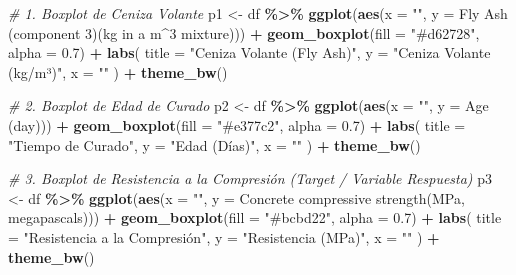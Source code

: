 \documentclass[
]{book}
\newenvironment{Shaded}{\begin{snugshade}}{\end{snugshade}}
\newcommand{\AttributeTok}[1]{\textcolor[rgb]{0.13,0.29,0.53}{#1}}
\newcommand{\CommentTok}[1]{\textcolor[rgb]{0.56,0.35,0.01}{\textit{#1}}}
\newcommand{\FloatTok}[1]{\textcolor[rgb]{0.00,0.00,0.81}{#1}}
\newcommand{\FunctionTok}[1]{\textcolor[rgb]{0.13,0.29,0.53}{\textbf{#1}}}
\newcommand{\NormalTok}[1]{#1}
\newcommand{\OtherTok}[1]{\textcolor[rgb]{0.56,0.35,0.01}{#1}}
\newcommand{\SpecialCharTok}[1]{\textcolor[rgb]{0.81,0.36,0.00}{\textbf{#1}}}
\newcommand{\StringTok}[1]{\textcolor[rgb]{0.31,0.60,0.02}{#1}}
\begin{document}
\begin{Shaded}
\begin{Highlighting}[]
\CommentTok{\# 1. Boxplot de Ceniza Volante}
\NormalTok{p1 }\OtherTok{\textless{}{-}}\NormalTok{ df }\SpecialCharTok{\%\textgreater{}\%}
  \FunctionTok{ggplot}\NormalTok{(}\FunctionTok{aes}\NormalTok{(}\AttributeTok{x =} \StringTok{""}\NormalTok{, }\AttributeTok{y =} \StringTok{\textasciigrave{}}\AttributeTok{Fly Ash (component 3)(kg in a m\^{}3 mixture)}\StringTok{\textasciigrave{}}\NormalTok{)) }\SpecialCharTok{+}
  \FunctionTok{geom\_boxplot}\NormalTok{(}\AttributeTok{fill =} \StringTok{"\#d62728"}\NormalTok{, }\AttributeTok{alpha =} \FloatTok{0.7}\NormalTok{) }\SpecialCharTok{+}
  \FunctionTok{labs}\NormalTok{(}
    \AttributeTok{title =} \StringTok{"Ceniza Volante (Fly Ash)"}\NormalTok{,}
    \AttributeTok{y =} \StringTok{"Ceniza Volante (kg/m³)"}\NormalTok{,}
    \AttributeTok{x =} \StringTok{""}
\NormalTok{  ) }\SpecialCharTok{+}
  \FunctionTok{theme\_bw}\NormalTok{()}


\CommentTok{\# 2. Boxplot de Edad de Curado}
\NormalTok{p2 }\OtherTok{\textless{}{-}}\NormalTok{ df }\SpecialCharTok{\%\textgreater{}\%}
  \FunctionTok{ggplot}\NormalTok{(}\FunctionTok{aes}\NormalTok{(}\AttributeTok{x =} \StringTok{""}\NormalTok{, }\AttributeTok{y =} \StringTok{\textasciigrave{}}\AttributeTok{Age (day)}\StringTok{\textasciigrave{}}\NormalTok{)) }\SpecialCharTok{+}
  \FunctionTok{geom\_boxplot}\NormalTok{(}\AttributeTok{fill =} \StringTok{"\#e377c2"}\NormalTok{, }\AttributeTok{alpha =} \FloatTok{0.7}\NormalTok{) }\SpecialCharTok{+}
  \FunctionTok{labs}\NormalTok{(}
    \AttributeTok{title =} \StringTok{"Tiempo de Curado"}\NormalTok{,}
    \AttributeTok{y =} \StringTok{"Edad (Días)"}\NormalTok{,}
    \AttributeTok{x =} \StringTok{""}
\NormalTok{  ) }\SpecialCharTok{+}
  \FunctionTok{theme\_bw}\NormalTok{()}

\CommentTok{\# 3. Boxplot de Resistencia a la Compresión (Target / Variable Respuesta)}
\NormalTok{p3 }\OtherTok{\textless{}{-}}\NormalTok{ df }\SpecialCharTok{\%\textgreater{}\%}
  \FunctionTok{ggplot}\NormalTok{(}\FunctionTok{aes}\NormalTok{(}\AttributeTok{x =} \StringTok{""}\NormalTok{, }\AttributeTok{y =} \StringTok{\textasciigrave{}}\AttributeTok{Concrete compressive strength(MPa, megapascals)}\StringTok{\textasciigrave{}}\NormalTok{)) }\SpecialCharTok{+}
  \FunctionTok{geom\_boxplot}\NormalTok{(}\AttributeTok{fill =} \StringTok{"\#bcbd22"}\NormalTok{, }\AttributeTok{alpha =} \FloatTok{0.7}\NormalTok{) }\SpecialCharTok{+}
  \FunctionTok{labs}\NormalTok{(}
    \AttributeTok{title =} \StringTok{"Resistencia a la Compresión"}\NormalTok{,}
    \AttributeTok{y =} \StringTok{"Resistencia (MPa)"}\NormalTok{,}
    \AttributeTok{x =} \StringTok{""}
\NormalTok{  ) }\SpecialCharTok{+}
  \FunctionTok{theme\_bw}\NormalTok{()}
\end{Highlighting}
\end{Shaded}
\end{document}
